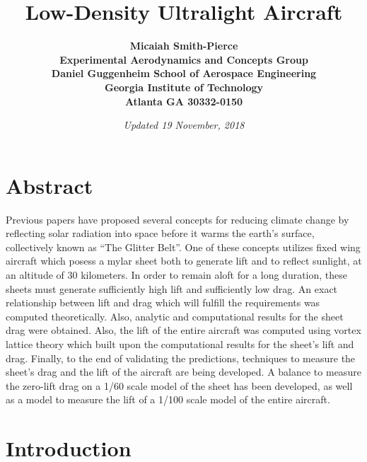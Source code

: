 \documentclass[12pt]{report} %
\title{\bf Low-Density Ultralight Aircraft\\  }
\author{\bf Micaiah Smith-Pierce
\\ Experimental Aerodynamics and Concepts Group
\\Daniel Guggenheim School of Aerospace Engineering
\\Georgia Institute of Technology
\\Atlanta GA 30332-0150
}
\date{\it Updated 19 November, 2018} %
\begin{document}
\maketitle
 
\tableofcontents
 
\chapter{Abstract}
Previous papers have proposed several concepts for reducing climate change by reflecting solar radiation into space before it warms the earth's
surface, collectively known as ``The Glitter Belt''. One of these concepts utilizes fixed wing aircraft which posess a mylar sheet both to generate
lift and to reflect sunlight, at an altitude of 30 kilometers. In order to remain aloft for a long duration, these sheets must generate
sufficiently high lift and sufficiently low drag. An exact relationship between lift and drag which will fulfill the requirements was
computed theoretically. Also, analytic and computational results for the sheet drag were obtained. Also, the lift of the entire aircraft
was computed using vortex lattice theory which built upon the computational results for the sheet's lift and drag. Finally, to the end
of validating the predictions, techniques to measure the sheet's drag and the lift of the aircraft are being developed. A balance to measure
the zero-lift drag on a 1/60 scale model of the sheet has been developed, as well as a model to measure the lift of a 1/100 scale model of
the entire aircraft.

\chapter{Introduction}
\end{document}

